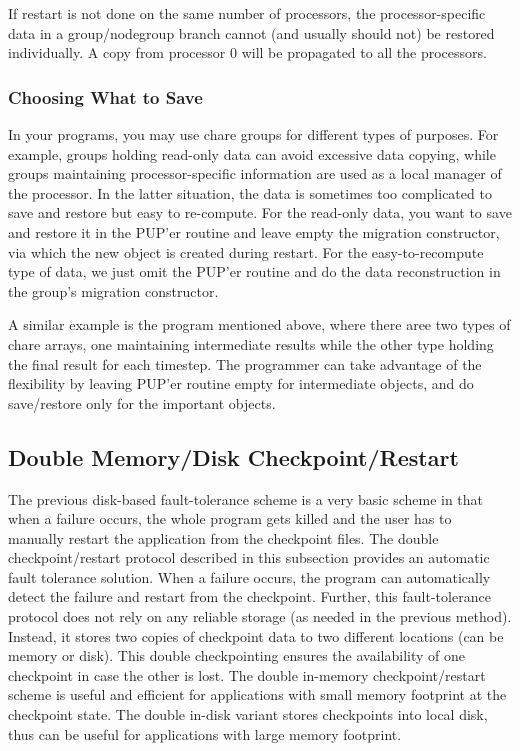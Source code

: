 If restart is not done on the same number of processors, the processor-specific
data in a group/nodegroup branch cannot (and usually should not) be 
restored individually. A copy from processor 0 will be propagated to all 
the processors.

\subsubsection{Choosing What to Save}

In your programs, you may use chare groups for different types of purposes. 
For example, groups holding read-only data can avoid excessive data copying,
while groups maintaining processor-specific information are used as a local
manager of the processor. In the latter situation, the data is sometimes
too complicated to save and restore but easy to re-compute. For the read-only
data, you want to save and restore it in the PUP'er routine and leave empty
the migration constructor, via which the new object is created during restart.
For the easy-to-recompute type of data, we just omit the PUP'er routine and
do the data reconstruction in the group's migration constructor.

A similar example is the program mentioned above, where there aree two 
types of chare arrays, one maintaining intermediate results while the 
other type holding the final result for each timestep. The programmer 
can take advantage of the flexibility by leaving PUP'er routine empty
for intermediate objects, and do save/restore only for the important 
objects. 

\subsection{Double Memory/Disk Checkpoint/Restart}

\label{sec:MemCheckpointing}

The previous disk-based fault-tolerance scheme is a very basic scheme in 
that when a failure occurs, the whole program gets killed and the user has to
manually restart the application from the checkpoint files.
The double checkpoint/restart protocol described in this subsection
provides an automatic fault tolerance solution. When a failure occurs,
the program can automatically detect the failure and restart from the 
checkpoint.
Further, this fault-tolerance protocol does not rely on any reliable
storage (as needed in the previous method). 
Instead, it stores two copies of checkpoint data to two different
locations (can be memory or disk).
This double checkpointing ensures the availability of one checkpoint in case
the other is lost. 
The double in-memory checkpoint/restart scheme is useful and efficient
for applications with small memory footprint at the checkpoint state. 
The double in-disk variant stores checkpoints into local disk, thus 
can be useful for applications with large memory footprint. 


